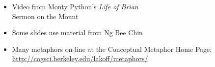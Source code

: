 \documentclass[headrule,footrule]{foils}
\begin{document}
 \begin{itemize}
 \item Video from Monty Python's  \textit{Life of Brian} 
 \\ Sermon on the Mount
  \item Some slides use material from Ng Bee Chin
  \item Many metaphors on-line at the Conceptual Metaphor Home Page:
\\ \url{http://cogsci.berkeley.edu/lakoff/metaphors/}
 \end{itemize}

 
 
\end{document}
